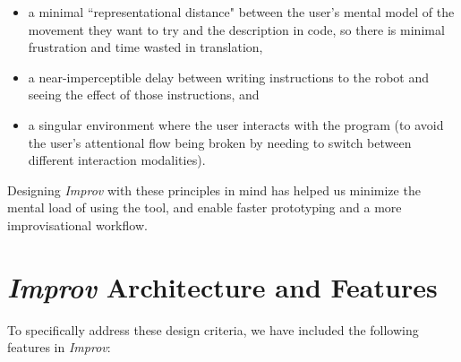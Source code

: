 \documentclass[sigchi-a]{acmart}
\begin{document}
\begin{itemize}
\item a minimal ``representational
distance" between the user's mental model of the movement they want to try and
the description in code, so there is minimal frustration and time wasted in
translation,
\item a near-imperceptible delay between writing instructions to the robot and
seeing the effect of those instructions, and
\item a singular environment where the
user interacts with the program (to avoid the user's attentional flow being
broken by needing to switch between different interaction modalities).
\end{itemize}

Designing \emph{Improv} with these principles in mind has helped us minimize the mental
load of using the tool, and enable faster prototyping and a more
improvisational workflow.


\section{\emph{Improv} Architecture and Features}\label{architecture-overview}



To specifically address these design criteria, we have
included the following features in \emph{Improv}:
\end{document}
